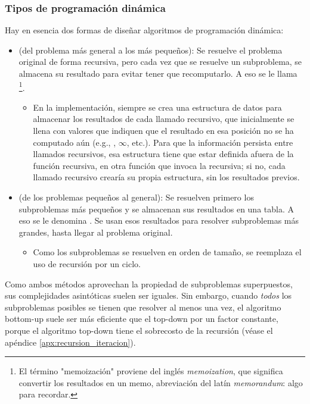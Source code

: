 \subsubsection{Tipos de programación dinámica}

Hay en esencia dos formas de diseñar algoritmos de programación dinámica: 
\begin{itemize}
    \item {} (del problema más general a los más pequeños): Se resuelve el problema original de forma recursiva, pero cada vez que se resuelve un subproblema, se almacena su resultado para evitar tener que recomputarlo. A eso se le llama \footnote{El término "memoización" proviene del inglés \textit{memoization}, que significa convertir los resultados en un memo, abreviación del latín \textit{memorandum}: algo para recordar.}.
    \begin{itemize}
        \item En la implementación, siempre se crea una estructura de datos para almacenar los resultados de cada llamado recursivo, que inicialmente se llena con valores que indiquen que el resultado en esa posición no se ha computado aún (e.g., , $\infty$, etc.). Para que la información persista entre llamados recursivos, esa estructura tiene que estar definida afuera de la función recursiva, en otra función que invoca la recursiva; si no, cada llamado recursivo crearía su propia estructura, sin los resultados previos.
    \end{itemize}
    \item {} (de los problemas pequeños al general): Se resuelven primero los subproblemas más pequeños y se almacenan sus resultados en una tabla. A eso se le denomina . Se usan esos resultados para resolver subproblemas más grandes, hasta llegar al problema original.
    \begin{itemize}
        \item Como los subproblemas se resuelven en orden de tamaño, se reemplaza el uso de recursión por un ciclo. 
    \end{itemize}
\end{itemize}

Como ambos métodos aprovechan la propiedad de subproblemas superpuestos, sus complejidades asintóticas suelen ser iguales. Sin embargo, cuando \textit{todos} los subproblemas posibles se tienen que resolver al menos una vez, el algoritmo bottom-up suele ser más eficiente que el top-down por un factor constante, porque el algoritmo top-down tiene el sobrecosto de la recursión (véase el apéndice \ref{apx:recursion_iteracion}).

